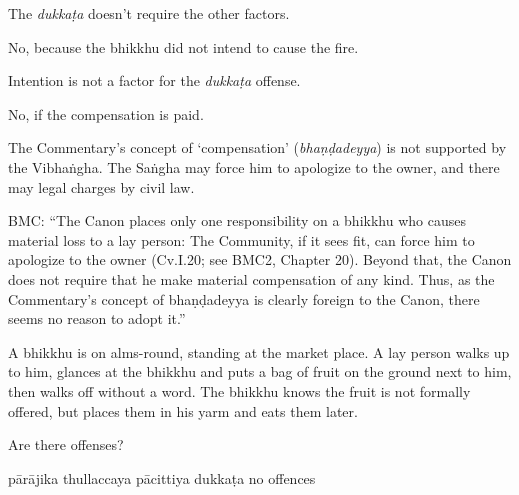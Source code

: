 \begin{exam}{\autoExamName}
\begin{problem}
\begin{manswers}{1}
    \begin{solution}
      The \emph{dukkaṭa} doesn't require the other factors.
    \end{solution}

     No, because the bhikkhu did not intend to cause the fire. \eAns

    \begin{solution}
      Intention is not a factor for the \emph{dukkaṭa} offense.
    \end{solution}

     No, if the compensation is paid. \eAns

    \begin{solution}
      The Commentary's concept of `compensation' (\emph{bhaṇḍadeyya}) is not supported by the Vibhaṅgha.
      The Saṅgha may force him to apologize to the owner, and there may legal charges by civil law.

      BMC: ``The Canon places only one responsibility on a bhikkhu who causes material loss to a lay person: The Community, if it sees fit, can force him to apologize to the owner (Cv.I.20; see BMC2, Chapter 20). Beyond that, the Canon does not require that he make material compensation of any kind. Thus, as the Commentary's concept of bhaṇḍadeyya is clearly foreign to the Canon, there seems no reason to adopt it.''
    \end{solution}

    \eChoices
  \end{manswers}

\end{problem}

\ifnosolutions
\clearpage
\fi

\begin{problem}

  A bhikkhu is on alms-round, standing at the market place.
  A lay person walks up to him,
  glances at the bhikkhu and puts a bag of fruit on the ground next to him,
  then walks off without a word.
  The bhikkhu knows the fruit is not formally offered,
  but places them in his yarm and eats them later.

  Are there offenses?

  \bigskip

  \begin{answers}{5}
    \bChoices
     pārājika\eAns
     thullaccaya\eAns
     pācittiya\eAns
     dukkaṭa\eAns
     no offences\eAns
    \eChoices
  \end{answers}


\end{problem}
\end{exam}
